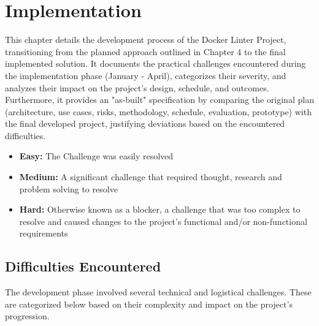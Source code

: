 \chapter{Implementation}
\label{chap:imp}
This chapter details the development process of the Docker Linter Project, transitioning from the planned approach outlined in Chapter 4 to the final implemented solution. It documents the practical challenges encountered during the implementation phase (January - April), categorizes their severity, and analyzes their impact on the project's design, schedule, and outcomes. Furthermore, it provides an "as-built" specification by comparing the original plan (architecture, use cases, risks, methodology, schedule, evaluation, prototype) with the final developed project, justifying deviations based on the encountered difficulties.
\begin{itemize}
    \item \textbf{Easy:} The Challenge was easily resolved
    \item \textbf{Medium:} A significant challenge that required thought, research and problem solving to resolve
    \item \textbf{Hard:} Otherwise known as a blocker, a challenge that was too complex to resolve
and caused changes to the project’s functional and/or non-functional requirements
\end{itemize}
\section{Difficulties Encountered}
\label{sec:difficulties}
The development phase involved several technical and logistical challenges. These are categorized below based on their complexity and impact on the project's progression.

